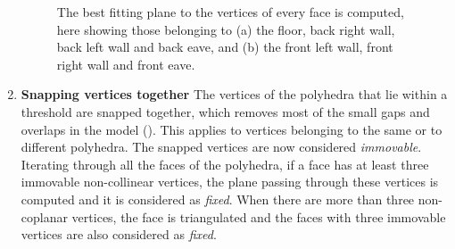\begin{enumerate}
\begin{figure}[tbp]
\quad
{}
\caption[Computing the best fitting plane of every face]{The best fitting plane to the vertices of every face is computed, here showing those belonging to (a) the floor, back right wall, back left wall and back eave, and (b) the front left wall, front right wall and front eave.}
\label{fig:faceplanes}
\end{figure}

\item
\textbf{Snapping vertices together}
The vertices of the polyhedra that lie within a threshold are snapped together, which removes most of the small gaps and overlaps in the model ().
This applies to vertices belonging to the same or to different polyhedra.
The snapped vertices are now considered \emph{immovable}.
Iterating through all the faces of the polyhedra, if a face has at least three immovable non-collinear vertices, the plane passing through these vertices is computed and it is considered as \emph{fixed}.
When there are more than three non-coplanar vertices, the face is triangulated and the faces with three immovable vertices are also considered as \emph{fixed}.


\end{enumerate}
